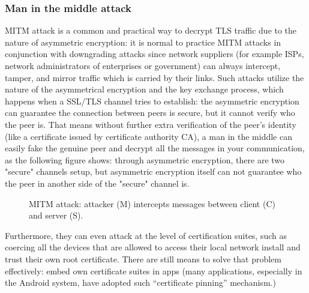 \documentclass[conference]{IEEEtran}
\begin{document}
\subsubsection{Man in the middle attack}\label{sec:mitm}
MITM attack is a common and practical way to decrypt TLS traffic due to the nature of asymmetric encryption: 
it is normal to practice MITM attacks in conjunction with downgrading attacks since network suppliers (for example ISPs, network administrators of enterprises or government) can always intercept, tamper, and mirror traffic which is carried by their links. 
Such attacks utilize the nature of the asymmetrical encryption and the key exchange process, which happens when a SSL/TLS channel tries to establish: the asymmetric encryption can guarantee the connection between peers is secure, but it cannot verify who the peer is. That means without further extra verification of the peer's identity (like a certificate issued by certificate authority CA), a man in the middle can easily fake the genuine peer and decrypt all the messages in your communication, as the following figure shows: through asymmetric encryption, there are two "secure" channels setup, but asymmetric encryption itself can not guarantee who the peer in another side of the "secure" channel is.

\begin{figure}[!h]
\centering

\caption{MITM attack: attacker (M) intercepts messages between client (C) and server (S).}
\label{fig:mitm}
\end{figure}

Furthermore, they can even attack at the level of certification suites, such as coercing all the devices that are allowed to access their local network install and trust their own root certificate. There are still means to solve that problem effectively: embed own certificate suites in apps (many applications, especially in the Android system, have adopted such “certificate pinning” mechanism.) 
\end{document}
